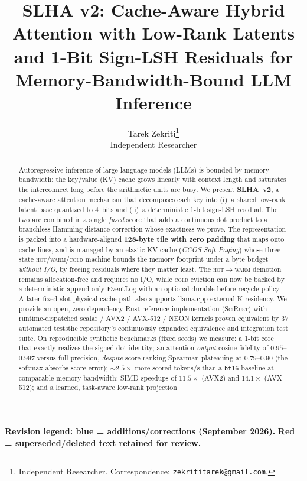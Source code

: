 \documentclass[11pt]{article}
\title{\textbf{SLHA v2: Cache-Aware Hybrid Attention with Low-Rank
Latents and 1-Bit Sign-LSH Residuals for Memory-Bandwidth-Bound
LLM Inference}}
\author{
  Tarek Zekriti\thanks{Independent Researcher. Correspondence:
  \texttt{zekrititarek@gmail.com}.}\\
  \small Independent Researcher
}
\date{\deleted{June 2026}\quad\added{September 2026 revision}}
\newcommand{\added}[1]{\textcolor{revisionblue}{#1}}
\newcommand{\deleted}[1]{\textcolor{revisionred}{#1}}
\theoremstyle{plain}
\theoremstyle{definition}
\begin{document}
\maketitle

\begin{center}
\small
\added{\textbf{Revision legend: blue = additions/corrections (September 2026).}}
\quad
\deleted{\textbf{Red = superseded/deleted text retained for review.}}
\end{center}

\begin{abstract}
\noindent
Autoregressive inference of large language models (LLMs) is bounded by
memory bandwidth: the key/value (KV) cache grows linearly with context
length and saturates the interconnect long before the arithmetic units
are busy. We present \textbf{SLHA~v2}, a cache-aware attention mechanism
that decomposes each key into (i)~a shared low-rank latent base
quantized to 4~bits and (ii)~a deterministic 1-bit sign-LSH residual.
The two are combined in a single \emph{fused} score that adds a
continuous dot product to a branchless Hamming-distance correction whose
exactness we prove. The representation is packed into a hardware-aligned
\textbf{128-byte tile with zero padding} that maps onto cache lines, and
is managed by an elastic KV cache (\emph{CCOS Soft-Paging}) whose
three-state \textsc{hot}/\textsc{warm}/\textsc{cold} machine bounds the
\deleted{memory footprint under a byte budget \emph{without I/O}, by freeing
residuals where they matter least.}
\added{The \textsc{hot}$\to$\textsc{warm} demotion remains allocation-free and
requires no I/O, while \textsc{cold} eviction can now be backed by a
deterministic append-only EventLog with an optional durable-before-recycle
policy. A later fixed-slot physical cache path also supports llama.cpp
external-K residency.} We provide an open, zero-dependency
Rust reference implementation (\textsc{SciRust}) with
runtime-dispatched scalar / AVX2 / AVX-512 / NEON kernels proven
equivalent by \deleted{37 automated tests}\added{the repository's continuously
expanded equivalence and integration test suite}. On reproducible synthetic benchmarks
(fixed seeds) we measure: a 1-bit core that exactly realizes the
signed-dot identity; an attention-\emph{output} cosine fidelity of
$0.95$--$0.997$ versus full precision, \emph{despite} score-ranking
Spearman plateauing at $0.79$--$0.90$ (the softmax absorbs score error);
$\sim\!2.5\times$ more scored tokens/s than a \texttt{bf16} baseline at
comparable memory bandwidth; SIMD speedups of $11.5\times$ (AVX2) and
$14.1\times$ (AVX-512); and a learned, task-aware low-rank projection

\end{abstract}
\end{document}
